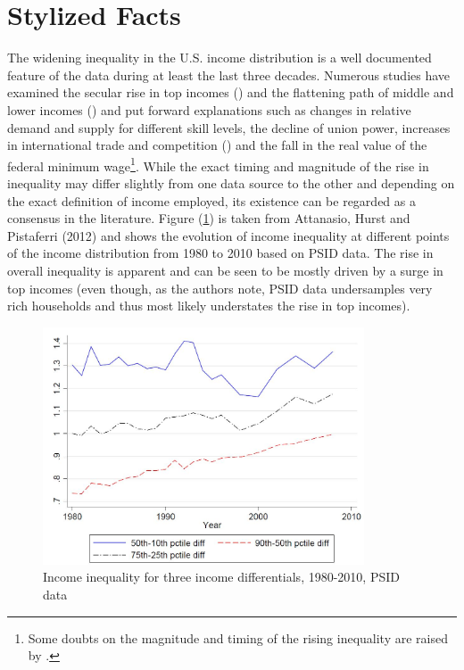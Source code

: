 \section{Stylized Facts}\label{sec:sf}
The widening inequality in the U.S. income distribution is a well documented 
feature of the data during at least the last three decades. Numerous studies 
have examined the secular rise in top incomes (\citealp{PikettySaez2003}) and 
the flattening path of middle and lower incomes (\citealp{AutorKatzKearney2005})
 and put forward explanations such as changes in relative demand and supply for 
different skill levels, the decline of union power, increases in international 
trade and competition (\citealp{Ma2013}) and the fall in the real value of the 
federal minimum wage\footnote{Some doubts on the magnitude and timing of the 
rising inequality are raised by \citet{Gordon2009}.}. While the exact timing and
 magnitude of the rise in inequality may differ slightly from one data source to 
the other and depending on the exact definition of income employed, its existence 
can be regarded as a consensus in the literature. Figure (\ref{fig:inc_ineq}) is 
taken from Attanasio, Hurst and Pistaferri (2012) and shows the evolution of 
income inequality at different points of the income distribution from 1980 to 
2010 based on PSID data. The rise in overall inequality is apparent and can be 
seen to be mostly driven by a surge in top incomes (even though, as the authors 
note, PSID data undersamples very rich households and thus most likely understates
 the rise in top incomes). 
\begin{figure}[ht]
	\centering
		\includegraphics[width=0.85\textwidth]{inc_ineq_attanasio2012.JPG}
		\caption{Income inequality for three income differentials, 1980-2010, PSID data}
	\label{fig:inc_ineq}
\end{figure}
